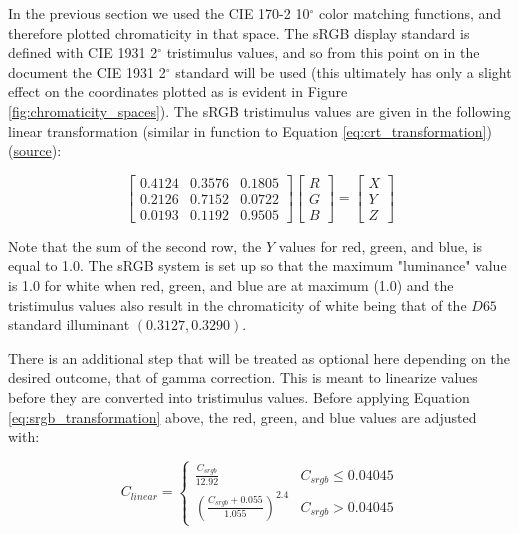 \documentclass{article}
\begin{document}
\begin{multicols}{2}
In the previous section we used the CIE 170-2 10$^\circ$ color matching functions, and therefore plotted chromaticity in that space.  The sRGB display standard is defined with CIE 1931 2$^\circ$ tristimulus values, and so from this point on in the document the CIE 1931 2$^\circ$ standard will be used (this ultimately has only a slight effect on the coordinates plotted as is evident in Figure \ref{fig:chromaticity_spaces}).  The sRGB tristimulus values are given in the following linear transformation (similar in function to Equation \ref{eq:crt_transformation}) (\href{https://en.wikipedia.org/wiki/SRGB}{source}):

\begin{equation}\label{eq:srgb_transformation} %
    \begin{bmatrix}
        0.4124&0.3576&0.1805\\
        0.2126&0.7152&0.0722\\
        0.0193&0.1192&0.9505
    \end{bmatrix}\begin{bmatrix}
        R\\
        G\\
        B
    \end{bmatrix}=\begin{bmatrix}
        X\\
        Y\\
        Z
    \end{bmatrix}
\end{equation}

Note that the sum of the second row, the $Y$ values for red, green, and blue, is equal to 1.0.  The sRGB system is set up so that the maximum "luminance" value is 1.0 for white when red, green, and blue are at maximum (1.0) and the tristimulus values also result in the chromaticity of white being that of the $D65$ standard illuminant $(0.3127,0.3290)$.

There is an additional step that will be treated as optional here depending on the desired outcome, that of gamma correction.  This is meant to linearize values before they are converted into tristimulus values.  Before applying Equation \ref{eq:srgb_transformation} above, the red, green, and blue values are adjusted with:

\begin{equation}\label{eq:gamma_correction} %
    C_{linear}=\left\{\begin{array}{ll}
        \frac{C_{srgb}}{12.92}&C_{srgb}\leq0.04045\\
        \left(\frac{C_{srgb}+0.055}{1.055}\right)^{2.4}&C_{srgb}>0.04045
    \end{array}\right.
\end{equation}


\end{multicols}
\end{document}
